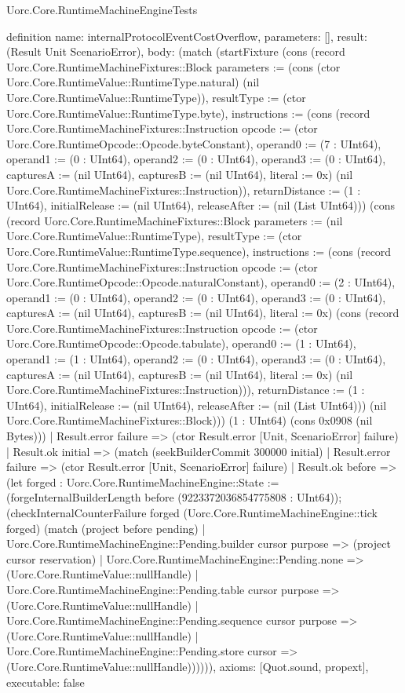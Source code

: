 \begin{lexlean}{Uorc.Core.RuntimeMachineEngineTests}
\begin{semanticmodule}
definition{
  name: internalProtocolEventCostOverflow,
  parameters: [],
  result: (Result Unit ScenarioError),
  body: (match (startFixture (cons (record Uorc.Core.RuntimeMachineFixtures::Block {parameters := (cons (ctor Uorc.Core.RuntimeValue::RuntimeType.natural) (nil Uorc.Core.RuntimeValue::RuntimeType)), resultType := (ctor Uorc.Core.RuntimeValue::RuntimeType.byte), instructions := (cons (record Uorc.Core.RuntimeMachineFixtures::Instruction {opcode := (ctor Uorc.Core.RuntimeOpcode::Opcode.byteConstant), operand0 := (7 : UInt64), operand1 := (0 : UInt64), operand2 := (0 : UInt64), operand3 := (0 : UInt64), capturesA := (nil UInt64), capturesB := (nil UInt64), literal := 0x}) (nil Uorc.Core.RuntimeMachineFixtures::Instruction)), returnDistance := (1 : UInt64), initialRelease := (nil UInt64), releaseAfter := (nil (List UInt64))}) (cons (record Uorc.Core.RuntimeMachineFixtures::Block {parameters := (nil Uorc.Core.RuntimeValue::RuntimeType), resultType := (ctor Uorc.Core.RuntimeValue::RuntimeType.sequence), instructions := (cons (record Uorc.Core.RuntimeMachineFixtures::Instruction {opcode := (ctor Uorc.Core.RuntimeOpcode::Opcode.naturalConstant), operand0 := (2 : UInt64), operand1 := (0 : UInt64), operand2 := (0 : UInt64), operand3 := (0 : UInt64), capturesA := (nil UInt64), capturesB := (nil UInt64), literal := 0x}) (cons (record Uorc.Core.RuntimeMachineFixtures::Instruction {opcode := (ctor Uorc.Core.RuntimeOpcode::Opcode.tabulate), operand0 := (1 : UInt64), operand1 := (1 : UInt64), operand2 := (0 : UInt64), operand3 := (0 : UInt64), capturesA := (nil UInt64), capturesB := (nil UInt64), literal := 0x}) (nil Uorc.Core.RuntimeMachineFixtures::Instruction))), returnDistance := (1 : UInt64), initialRelease := (nil UInt64), releaseAfter := (nil (List UInt64))}) (nil Uorc.Core.RuntimeMachineFixtures::Block))) (1 : UInt64) (cons 0x0908 (nil Bytes)))
    | Result.error failure => (ctor Result.error [Unit, ScenarioError] failure)
    | Result.ok initial => (match (seekBuilderCommit 300000 initial)
      | Result.error failure => (ctor Result.error [Unit, ScenarioError] failure)
      | Result.ok before => (let forged : Uorc.Core.RuntimeMachineEngine::State := (forgeInternalBuilderLength before (9223372036854775808 : UInt64)); (checkInternalCounterFailure forged (Uorc.Core.RuntimeMachineEngine::tick forged) (match (project before pending)
        | Uorc.Core.RuntimeMachineEngine::Pending.builder cursor purpose => (project cursor reservation)
        | Uorc.Core.RuntimeMachineEngine::Pending.none => (Uorc.Core.RuntimeValue::nullHandle)
        | Uorc.Core.RuntimeMachineEngine::Pending.table cursor purpose => (Uorc.Core.RuntimeValue::nullHandle)
        | Uorc.Core.RuntimeMachineEngine::Pending.sequence cursor purpose => (Uorc.Core.RuntimeValue::nullHandle)
        | Uorc.Core.RuntimeMachineEngine::Pending.store cursor => (Uorc.Core.RuntimeValue::nullHandle)))))),
  axioms: [Quot.sound, propext],
  executable: false
}


\end{semanticmodule}
\end{lexlean}
